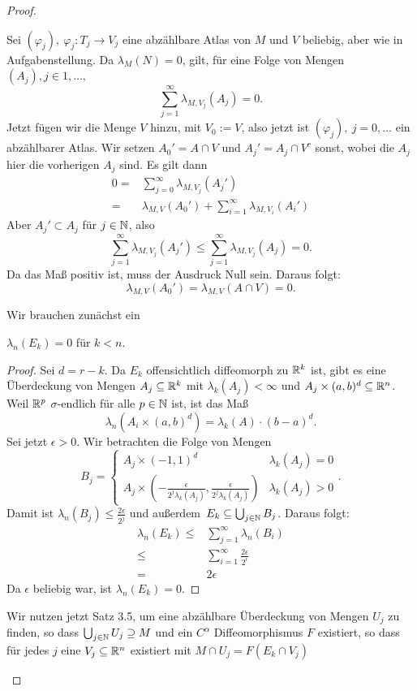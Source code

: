 \begin{proof}
	\begin{parts}
	\item Sei $(\varphi_j),~\varphi_j:T_j\to V_j$ eine abzählbare Atlas von $M$ und $V $ beliebig, aber wie in Aufgabenstellung.  Da $\lambda_M(N)=0$, gilt, f\"{u}r eine Folge von Mengen $(A_j), j\in 1,\dots$,
		\[
			\sum_{j=1}^\infty \lambda_{M,V_j}(A_j)=0
		.\] 
		Jetzt fügen wir die Menge $V$ hinzu, mit $V_0:=V$, also jetzt ist $(\varphi_j),~j=0,\dots$ ein abzählbarer Atlas. Wir setzen $A_0'=A\cap V$ und  $A_j'=A_j\cap V^c$ sonst, wobei die $A_j$ hier die vorherigen $A_j$ sind. Es gilt dann
		\begin{align*}
			0=&\sum_{j=0}^\infty \lambda_{M,V_j}(A_j')\\
			=&\lambda_{M,V}(A_0')+\sum_{i=1}^\infty \lambda_{M,V_i}(A_i')
		\end{align*}
		Aber $A_j'\subset A_j$ f\"{u}r $j\in \mathbb{N}$, also
		\[
			\sum_{j=1}^\infty \lambda_{M,V_j}(A_j')\le \sum_{j=1}^\infty \lambda_{M,V_j}(A_j)=0
		.\] 
		Da das Maß positiv ist, muss der Ausdruck Null sein. Daraus folgt:
		\[
			\lambda_{M,V}(A_0')=\lambda_{M,V}(A\cap V)=0
		.\] 
	\item Wir brauchen zunächst ein
		\begin{tcolorbox}
		\begin{Lemma}
			$\lambda_n(E_k)=0$ f\"{u}r $k<n$. 
		\end{Lemma}
		\begin{proof}
			Sei $d=r-k$. Da $E_k$ offensichtlich diffeomorph zu $\mathbb{R}^k$ ist, gibt es eine Überdeckung von Mengen $A_j\subseteq \mathbb{R}^k$ mit $\lambda_k(A_j)<\infty$ und $A_j\times (a,b)^d\subseteq \mathbb{R}^n $. Weil $\mathbb{R}^p$ $\sigma$-endlich f\"{u}r alle $p\in \mathbb{N}$ ist, ist das Maß
			\[
			\lambda_n(A_i\times (a,b)^d)=\lambda_k(A)\cdot (b-a)^d
			.\] 
			Sei jetzt $\epsilon>0$. Wir betrachten die Folge von Mengen
			\[
			B_j=\begin{cases}
				A_j\times (-1,1)^d & \lambda_k(A_j)=0\\
				A_j\times \left( -\frac{\epsilon}{2^j\lambda_k(A_j)}, \frac{\epsilon}{2^j\lambda_k(A_j)} \right) & \lambda_k(A_j)>0 
			\end{cases}
			.\] 
			Damit ist $\lambda_n(B_j)\le \frac{2\epsilon}{2^j}$ und außerdem $E_k\subseteq \bigcup_{j\in \mathbb{N}} B_j$. Daraus folgt:
			\begin{align*}
				\lambda_n(E_k)\le& \sum_{j=1}^\infty \lambda_n(B_i)\\
				\le& \sum_{i=1}^\infty \frac{2\epsilon}{2^i}\\
				=&2\epsilon
			\end{align*}
			Da $\epsilon$ beliebig war, ist $\lambda_n(E_k)=0$.
		\end{proof}
	\end{tcolorbox}
	Wir nutzen jetzt Satz 3.5, um eine abzählbare Überdeckung von Mengen $U_j$ zu finden, so dass $\bigcup_{j\in \mathbb{N}} U_j\supseteq M$ und ein $C^\alpha$ Diffeomorphismus $F$ existiert, so dass f\"{u}r jedes $j$ eine $V_j\subseteq \mathbb{R}^n$ existiert mit $M\cap U_j=F(E_k\cap V_j)$ 


\end{parts}
\end{proof}
